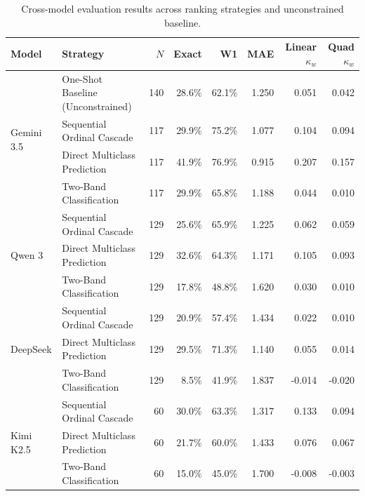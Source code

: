 \documentclass[runningheads]{llncs}
\begin{document}
\begin{table}[t]
\centering
\begin{threeparttable}

\caption{Cross-model evaluation results across ranking strategies and unconstrained baseline.}
\label{tab:multimodel_large}
\scriptsize
\setlength{\tabcolsep}{2.5pt}

\begin{tabular}{@{}llrrrrrr@{}}
\toprule
\textbf{Model} & \textbf{Strategy} & \textbf{$N$} & \textbf{Exact} & \textbf{W1} & \textbf{MAE} & \textbf{Linear $\kappa_w$} & \textbf{Quad $\kappa_w$} \\
\midrule

\multirow{4}{*}{Gemini 3.5} 
  & One-Shot Baseline (Unconstrained) & 140 & 28.6\% & 62.1\% & 1.250 & 0.051 & 0.042 \\
  & Sequential Ordinal Cascade        & 117 & 29.9\% & 75.2\% & 1.077 & 0.104 & 0.094 \\
  & Direct Multiclass Prediction      & 117 & 41.9\% & 76.9\% & 0.915 & 0.207 & 0.157 \\
  & Two-Band Classification           & 117 & 29.9\% & 65.8\% & 1.188 & 0.044 & 0.010 \\
\midrule

\multirow{3}{*}{Qwen 3} 
  & Sequential Ordinal Cascade        & 129 & 25.6\% & 65.9\% & 1.225 & 0.062 & 0.059 \\
  & Direct Multiclass Prediction      & 129 & 32.6\% & 64.3\% & 1.171 & 0.105 & 0.093 \\
  & Two-Band Classification           & 129 & 17.8\% & 48.8\% & 1.620 & 0.030 & 0.010 \\
\midrule

\multirow{3}{*}{DeepSeek} 
  & Sequential Ordinal Cascade        & 129 & 20.9\% & 57.4\% & 1.434 & 0.022 & 0.010 \\
  & Direct Multiclass Prediction      & 129 & 29.5\% & 71.3\% & 1.140 & 0.055 & 0.014 \\
  & Two-Band Classification           & 129 & 8.5\%  & 41.9\% & 1.837 & -0.014 & -0.020 \\
\midrule

\multirow{3}{*}{Kimi K2.5} 
  & Sequential Ordinal Cascade        & 60 & 30.0\% & 63.3\% & 1.317 & 0.133 & 0.094 \\
  & Direct Multiclass Prediction      & 60 & 21.7\% & 60.0\% & 1.433 & 0.076 & 0.067 \\
  & Two-Band Classification           & 60 & 15.0\% & 45.0\% & 1.700 & -0.008 & -0.003 \\
\midrule


\end{tabular}
\end{threeparttable}
\end{table}
\end{document}
